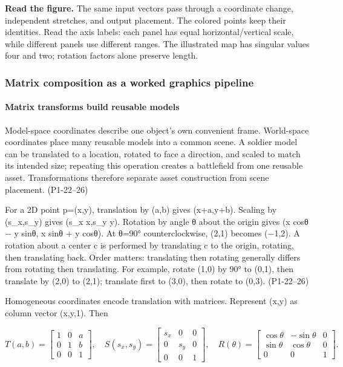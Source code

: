 \textbf{Read the figure.} The same input vectors pass through a coordinate change, independent stretches, and output placement. The colored points keep their identities. Read the axis labels: each panel has equal horizontal/vertical scale, while different panels use different ranges. The illustrated map has singular values four and two; rotation factors alone preserve length.

\subsubsection{Matrix composition as a worked graphics pipeline}\label{03-visual-computing-i-ch001-matrix-composition-as-a-worked-graphics-pipeline}

\hypertarget{03-visual-computing-i-ch001-matrix-composition-as-a-worked-graphics-pipeline}{}

\paragraph{Matrix transforms build reusable models}\label{03-visual-computing-i-ch001-matrix-transforms-build-reusable-models}

\hypertarget{03-visual-computing-i-ch001-matrix-transforms-build-reusable-models}{}

Model-space coordinates describe one object's own convenient frame. World-space coordinates place many reusable models into a common scene. A soldier model can be translated to a location, rotated to face a direction, and scaled to match its intended size; repeating this operation creates a battlefield from one reusable asset. Transformations therefore separate asset construction from scene placement. (P1-22--26)

For a 2D point p=(x,y), translation by (a,b) gives (x+a,y+b). Scaling by (s\_x,s\_y) gives (s\_x x,s\_y y). Rotation by angle θ about the origin gives (x cosθ − y sinθ, x sinθ + y cosθ). At θ=90° counterclockwise, (2,1) becomes (−1,2). A rotation about a center c is performed by translating c to the origin, rotating, then translating back. Order matters: translating then rotating generally differs from rotating then translating. For example, rotate (1,0) by 90° to (0,1), then translate by (2,0) to (2,1); translate first to (3,0), then rotate to (0,3). (P1-22--26)

Homogeneous coordinates encode translation with matrices. Represent (x,y) as column vector (x,y,1). Then

\[
T(a,b)=\begin{bmatrix}1&0&a\\0&1&b\\0&0&1\end{bmatrix},\quad
S(s_x,s_y)=\begin{bmatrix}s_x&0&0\\0&s_y&0\\0&0&1\end{bmatrix},\quad
R(\theta)=\begin{bmatrix}\cos\theta&-\sin\theta&0\\\sin\theta&\cos\theta&0\\0&0&1\end{bmatrix}.
\]


